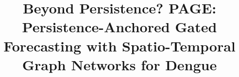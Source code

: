\documentclass[conference,a4paper]{IEEEtran}
\newcommand{\model}{PAGE}
\begin{document}
\title{Beyond Persistence? \model{}: Persistence-Anchored Gated Forecasting
with Spatio-Temporal Graph Networks for Dengue}

\author{
}

\maketitle

















\end{document}
